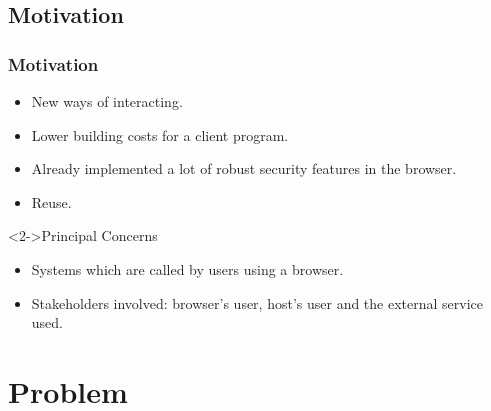 \documentclass[serif,9pt]{beamer}
\begin{document}

\subsection{Motivation}
\begin{frame}
	\frametitle{Motivation}
	\begin{itemize}
		\item New ways of interacting.
		\item Lower building costs for a client program.
		\item Already implemented a lot of robust security features in the browser.
		\item Reuse.
	\end{itemize}
	
	\begin{block}<2->{Principal Concerns}
	\begin{itemize}
		\item Systems which are called by users using a browser.
		\item Stakeholders involved: browser's user, host's user and the external service used.
	\end{itemize}
	\end{block}
\end{frame}

\section{Problem}
\end{document}
